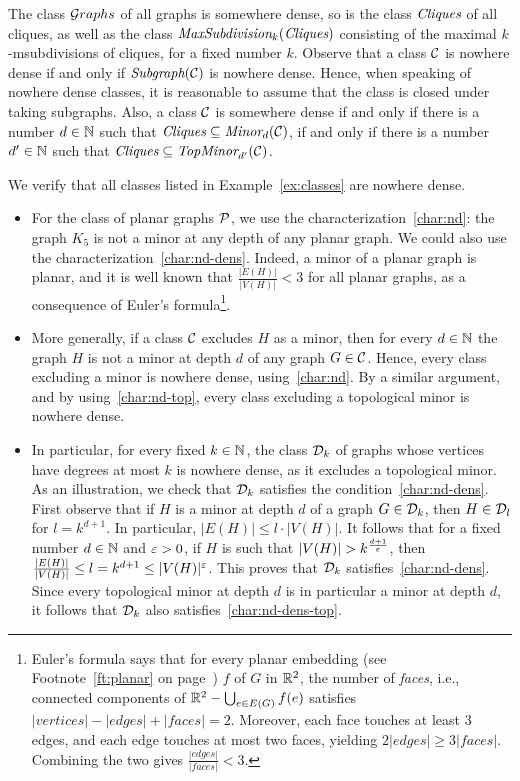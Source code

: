 \begin{example}
	The class ${\mathcal G}\!\,raphs$ of all graphs is somewhere dense,
	so is the class $\textit{Cliques}$ of all cliques,
  as well as the class $\textit{MaxSubdivision}_{k}(\textit{Cliques})$ consisting of the maximal $k$-msubdivisions of cliques, for a fixed number $k$.
  	Observe that a class ${\cal C}$
  is nowhere dense if and only if $\textit{Subgraph}({\cal C})$ is nowhere dense. 
  Hence, when speaking of nowhere dense classes,
  it is reasonable to assume that the class is closed under 
  taking subgraphs. Also, a class ${\cal C}$ is somewhere dense if and only if there is a number $d\in\mathbb{N}$
  such that $\textit{Cliques}\subseteq\textit{Minor}_{d}({\cal C})$, if and only if there is a number $d'\in\mathbb{N}$
  such that  $\textit{Cliques}\subseteq\textit{TopMinor}_{d'}({\cal C})$.
  \end{example}
  \begin{example}
		We verify that all classes listed in Example~\ref{ex:classes} are nowhere dense.
	\begin{itemize}
		\item For the class of planar graphs $\cal P$, we use the characterization~\eqref{char:nd}: the graph $K_5$ is not a minor at any depth of any planar graph. We could also use the characterization~\eqref{char:nd-dens}. Indeed, a minor of a planar graph is planar, and it is well known that $\frac{|E(H)|}{|V(H)|}<3$
		for all planar graphs, as a consequence of Euler's formula\footnote{Euler's formula says that 
		for every planar embedding (see Footnote~\ref{ft:planar} on page~\pageref{ft:planar}) $f$ of $G$ in $\mathbb{R}^2$, the number of \emph{faces}, i.e., connected components of $\mathbb{R}^2-\bigcup_{e\in E(G)}f(e)$ satisfies $|\textit{vertices}|-|\textit{edges}|+|\textit{faces}|=2$. Moreover,  each face touches at least $3$ edges, and each edge touches at most two faces, yielding $2|\textit{edges}|\ge 3|\textit{faces}|$. Combining the two gives $\frac{|\textit{edges}|}{|\textit{faces}|}< 3$.}.
		
		\item More generally, if a class ${\cal C}$ excludes $H$ as a minor, then for every $d\in \mathbb{N}$ the graph $H$
		is not a minor at depth $d$ of any graph $G\in{\cal C}$. Hence, every class excluding a minor is nowhere dense, using~\eqref{char:nd}. By a similar argument, and by using~\eqref{char:nd-top}, every class excluding a topological minor is nowhere dense.
		
		\item In particular, for every fixed $k\in \mathbb{N}$, the class ${\cal D}_k$ of graphs whose vertices have degrees at most $k$ is nowhere dense, as it excludes a topological minor. As an illustration, we check that ${\cal D}_k$  satisfies the  condition~\eqref{char:nd-dens}.
	First observe that if $H$ is a minor at depth $d$ of a graph $G\in{\cal D}_k$, then $H\in {\cal D}_l$ for $l=k^{d+1}$.  In particular, $|E(H)|\le l\cdot |V(H)|$.
	It follows that for a fixed number $d\in\mathbb{N}$ and $\varepsilon>0$, if $H$ is such that $|V(H)|>k^{\frac{d+1}\eps}$, then $\frac{|E(H)|}{|V(H)|}\le l=k^{d+1}\le |V(H)|^\varepsilon$.
This proves that ${\cal D}_k$ satisfies~\eqref{char:nd-dens}.
Since every topological minor at depth $d$	is in particular a minor at depth $d$, it follows that ${\cal D}_k$ also satisfies~\eqref{char:nd-dens-top}.
	\end{itemize}
\end{example}

